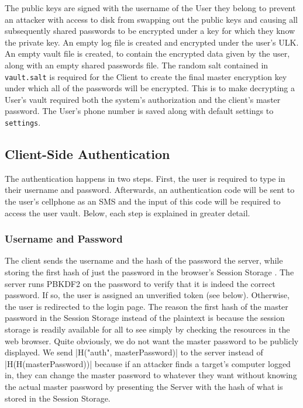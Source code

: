 \documentclass{article}
\begin{document}
\par The public keys are signed with the username of the User they belong to prevent an attacker with access to disk from swapping out the public keys and causing all subsequently shared passwords to be encrypted under a key for which they know the private key. An empty log file is created and encrypted under the user's ULK. An empty vault file is created, to contain the encrypted data given by the user, along with an empty shared passwords file. The random salt contained in \texttt{vault.salt} is required for the Client to create the final master encryption key under which all of the passwords will be encrypted. This is to make decrypting a User's vault required both the system's authorization and the client's master password. The User's phone number is saved along with default settings to \texttt{settings}.

\subsection{Client-Side Authentication}
\par The authentication happens in two steps. First, the user is required to type in their username and password. Afterwards, an authentication code will be sent to the user's cellphone as an SMS and the input of this code will be required to access the user vault. Below, each step is explained in greater detail.

\subsubsection{Username and Password}
\par The client sends the username and the hash of the password the server, while storing the first hash of just the password in the browser's Session Storage \cite{bib:session_storage}. The server runs PBKDF2 on the password to verify that it is indeed the correct password. If so, the user is assigned an unverified token (see below). Otherwise, the user is redirected to the login page. The reason the first hash of the master password in the Session Storage instead of the plaintext is because the session storage is readily available for all to see simply by checking the resources in the web browser. Quite obviously, we do not want the master password to be publicly displayed. We send |H("auth", masterPassword)| to the server instead of |H(H(masterPassword))| because if an attacker finds a target's computer logged in, they can change the master password to whatever they want without knowing the actual master password by presenting the Server with the hash of what is stored in the Session Storage.
\end{document}

